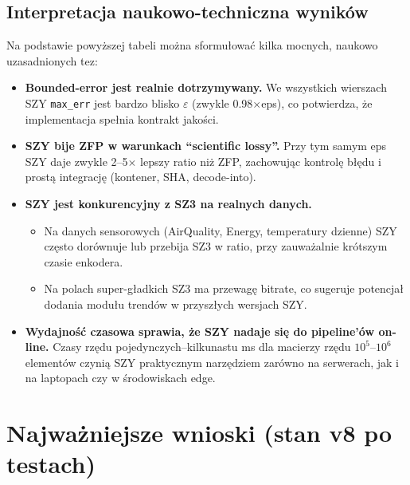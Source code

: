 \documentclass[11pt,a4paper]{article}
\begin{document}
\subsection{Interpretacja naukowo-techniczna wyników}
Na podstawie powyższej tabeli można sformułować kilka mocnych, naukowo uzasadnionych tez:

\begin{itemize}
  \item \textbf{Bounded-error jest realnie dotrzymywany.}
        We wszystkich wierszach SZY \texttt{max\_err} jest bardzo blisko $\varepsilon$ (zwykle 0.98$\times$eps), co potwierdza, że implementacja spełnia kontrakt jakości.
  \item \textbf{SZY bije ZFP w warunkach ``scientific lossy''.}
        Przy tym samym eps SZY daje zwykle 2--5$\times$ lepszy ratio niż ZFP, zachowując kontrolę błędu i prostą integrację (kontener, SHA, decode-into).
  \item \textbf{SZY jest konkurencyjny z SZ3 na realnych danych.}
        \begin{itemize}
          \item Na danych sensorowych (AirQuality, Energy, temperatury dzienne) SZY często dorównuje lub przebija SZ3 w ratio, przy zauważalnie krótszym czasie enkodera.
          \item Na polach super-gładkich SZ3 ma przewagę bitrate, co sugeruje potencjał dodania modułu trendów w przyszłych wersjach SZY.
        \end{itemize}
  \item \textbf{Wydajność czasowa sprawia, że SZY nadaje się do pipeline'ów on-line.}
        Czasy rzędu pojedynczych--kilkunastu ms dla macierzy rzędu $10^5$--$10^6$ elementów czynią SZY praktycznym narzędziem zarówno na serwerach, jak i na laptopach czy w środowiskach edge.
\end{itemize}

\section{Najważniejsze wnioski (stan v8 po testach)}
\end{document}
